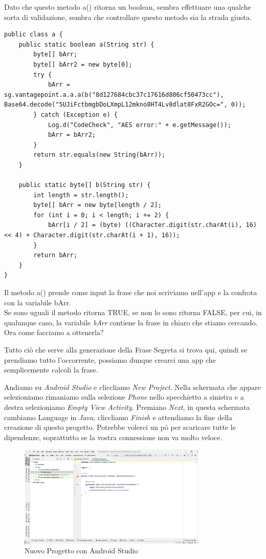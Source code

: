 \documentclass{article}
\begin{document}
Dato che questo metodo a() ritorna un 
boolean, sembra effettuare una qualche sorta di validazione, sembra che controllare questo metodo sia la strada giusta.
\begin{lstlisting}[style=JavaStyle]
public class a {
    public static boolean a(String str) {
        byte[] bArr;
        byte[] bArr2 = new byte[0];
        try {
            bArr = sg.vantagepoint.a.a.a(b("8d127684cbc37c17616d806cf50473cc"), Base64.decode("5UJiFctbmgbDoLXmpL12mkno8HT4Lv8dlat8FxR2GOc=", 0));
        } catch (Exception e) {
            Log.d("CodeCheck", "AES error:" + e.getMessage());
            bArr = bArr2;
        }
        return str.equals(new String(bArr));
    }

    public static byte[] b(String str) {
        int length = str.length();
        byte[] bArr = new byte[length / 2];
        for (int i = 0; i < length; i += 2) {
            bArr[i / 2] = (byte) ((Character.digit(str.charAt(i), 16) << 4) + Character.digit(str.charAt(i + 1), 16));
        }
        return bArr;
    }
}
\end{lstlisting}
Il metodo a() prende come input la frase che noi scriviamo nell'app e la confrota con la variabile bArr.\\ Se sono uguali il metodo ritorna TRUE, 
se non lo sono ritorna FALSE, per cui, in qualunque caso, la variabile \textit{bArr} contiene la frase in chiaro che stiamo cercando. 
Ora come facciamo a ottenerla?

Tutto ciò che serve alla generazione della Frase Segreta si trova qui, 
quindi se prendiamo tutto l'occorrente, possiamo dunque crearci una app che semplicemente calcoli la frase.

Andiamo su \textit{Android Studio} e cliccliamo \textit{New Project}. Nella schermata che appare selezioniamo rimaniamo sulla selezione \textit{Phone} nello specchietto 
a sinistra e a destra selezioniamo \textit{Empty View Activity}. Premiano \textit{Next}, in questa schermata cambiamo Language in \textit{Java}, cliccliamo \textit{Finish} e attendiamo la fine della creazione 
di questo progetto. Potrebbe volerci un pò per scaricare tutte le dipendenze, soprattutto se la vostra connessione non va molto veloce.
\begin{figure}[htbp]
    \centering
    \includegraphics[width=0.8\textwidth]{./uncrackable1/appAndStud.png}
    \captionsetup{labelformat=empty}
    \caption{Nuovo Progetto con Android Studio}
    \label{fig:appAS}
\end{figure}
\end{document}
